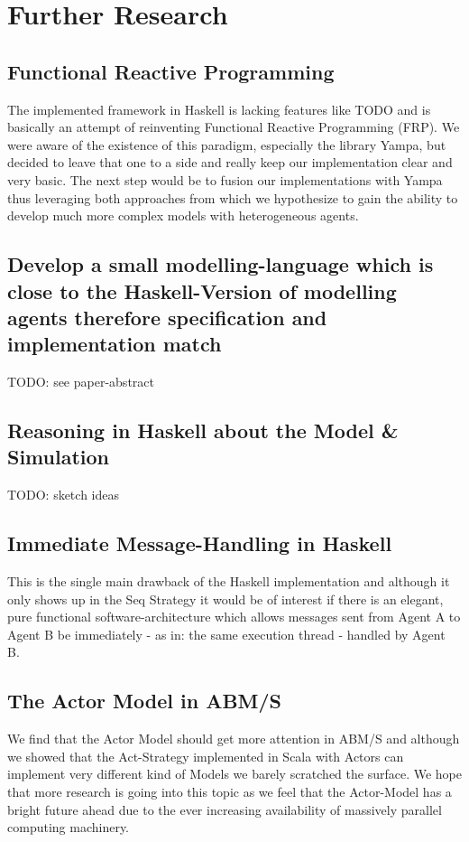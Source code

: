 \section{Further Research}

\subsection{Functional Reactive Programming}
The implemented framework in Haskell is lacking features like TODO and is basically an attempt of reinventing Functional Reactive Programming (FRP). We were aware of the existence of this paradigm, especially the library Yampa, but decided to leave that one to a side and really keep our implementation clear and very basic. The next step would be to fusion our implementations with Yampa thus leveraging both approaches from which we hypothesize to gain the ability to develop much more complex models with heterogeneous agents.

\subsection{Develop a small modelling-language which is close to the Haskell-Version of modelling agents therefore specification and implementation match}
TODO: see paper-abstract

\subsection{Reasoning in Haskell about the Model \& Simulation}
TODO: sketch ideas

\subsection{Immediate Message-Handling in Haskell}
This is the single main drawback of the Haskell implementation and although it only shows up in the Seq Strategy it would be of interest if there is an elegant, pure functional software-architecture which allows messages sent from Agent A to Agent B be immediately - as in: the same execution thread - handled by Agent B. 

\subsection{The Actor Model in ABM/S}
We find that the Actor Model should get more attention in ABM/S and although we showed that the Act-Strategy implemented in Scala with Actors can implement very different kind of Models we barely scratched the surface. We hope that more research is going into this topic as we feel that the Actor-Model has a bright future ahead due to the ever increasing availability of massively parallel computing machinery.